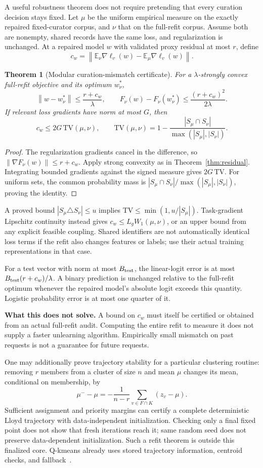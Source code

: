 \documentclass[11pt,a4paper]{article}
\newtheorem{theorem}{Theorem}[section]
\theoremstyle{definition}\newtheorem{definition}[theorem]{Definition}
\newcommand{\norm}[1]{\left\lVert #1\right\rVert}
\begin{document}
A useful robustness theorem does not require pretending that every curation decision stays fixed. Let $\mu$ be the uniform empirical measure on the exactly repaired fixed-curator corpus, and $\nu$ that on the full-refit corpus. Assume both are nonempty, shared records have the same loss, and regularization is unchanged. At a repaired model $w$ with validated proxy residual at most $r$, define
\[
 c_w=\norm{\mathbb E_\nu\nabla\ell_v(w)-\mathbb E_\mu\nabla\ell_v(w)}.
\]
\begin{theorem}[Modular curation-mismatch certificate]\label{thm:mismatch}
For a $\lambda$-strongly convex full-refit objective and its optimum $w_\nu^*$,
\[
 \norm{w-w_\nu^*}\le\frac{r+c_w}{\lambda},\qquad
 F_\nu(w)-F_\nu(w_\nu^*)\le\frac{(r+c_w)^2}{2\lambda}.
\]
If relevant loss gradients have norm at most $G$, then
\[
 c_w\le2G\,\mathrm{TV}(\mu,\nu),\qquad
 \mathrm{TV}(\mu,\nu)=1-\frac{|S_\mu\cap S_\nu|}{\max(|S_\mu|,|S_\nu|)}.
\]
\end{theorem}
\begin{proof}
The regularization gradients cancel in the difference, so $\norm{\nabla F_\nu(w)}\le r+c_w$. Apply strong convexity as in Theorem~\ref{thm:residual}. Integrating bounded gradients against the signed measure gives $2G\,\mathrm{TV}$. For uniform sets, the common probability mass is $|S_\mu\cap S_\nu|/\max(|S_\mu|,|S_\nu|)$, proving the identity.
\end{proof}
A proved bound $|S_\mu\triangle S_\nu|\le u$ implies $\mathrm{TV}\le\min(1,u/|S_\mu|)$. Task-gradient Lipschitz continuity instead gives $c_w\le L_gW_1(\mu,\nu)$, or an upper bound from any explicit feasible coupling. Shared identifiers are not automatically identical loss terms if the refit also changes features or labels; use their actual training representations in that case.

For a test vector with norm at most $B_{\rm test}$, the linear-logit error is at most $B_{\rm test}(r+c_w)/\lambda$. A binary prediction is unchanged relative to the full-refit optimum whenever the repaired model's absolute logit exceeds this quantity. Logistic probability error is at most one quarter of it.

\textbf{What this does not solve.} A bound on $c_w$ must itself be certified or obtained from an actual full-refit audit. Computing the entire refit to measure it does not supply a faster unlearning algorithm. Empirically small mismatch on past requests is not a guarantee for future requests.

One may additionally prove trajectory stability for a particular clustering routine: removing $r$ members from a cluster of size $n$ and mean $\mu$ changes its mean, conditional on membership, by
\[
 \mu^- -\mu=-\frac{1}{n-r}\sum_{v\in F\cap K}(z_v-\mu).
\]
Sufficient assignment and priority margins can certify a complete deterministic Lloyd trajectory with data-independent initialization. Checking only a final fixed point does not show that fresh iterations reach it; same random seed does not preserve data-dependent initialization. Such a refit theorem is outside this finalized core. Q-kmeans already uses stored trajectory information, centroid checks, and fallback~\cite{ginart2019}.
\end{document}
